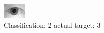 \begin{figure}[h!]
\begin{center}
\includegraphics[width=0.60\columnwidth]{figures/ID1066_class_2_target_3.png}
\end{center}
\caption{ Classification: 2 actual target: 3}
\label{fig:ID1066_class_2_target_3}
\end{figure}

